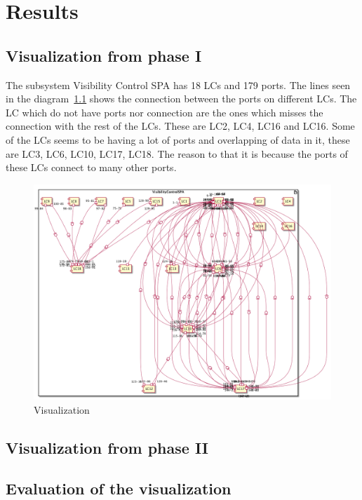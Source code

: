 \chapter{Results}

\section{Visualization from phase I}
The subsystem Visibility Control SPA has 18 LCs and 179 ports. The lines seen in the diagram~\ref{fig:visualization_one} shows the connection between the ports on different LCs. The LC which do not have ports nor connection are the ones which misses the connection with the rest of the LCs. These are LC2, LC4, LC16 and LC16. Some of the LCs seems to be having a lot of ports and overlapping of data in it, these are LC3, LC6, LC10, LC17, LC18. The reason to that it is because the ports of these LCs connect to many other ports.  
\todo{[to be filled in]}


\begin{figure}[H]
\centering
\captionsetup{justification=centering}
\vspace{0cm}%
\includegraphics[width=1\linewidth]{figure/results/visualization_1.png}
\caption{Visualization}
\label{fig:visualization_one}
\end{figure}

\todo{[to be filled in]}


\section{Visualization from phase II}
\todo{[to be filled in]}


\section{Evaluation of the visualization}
\todo{[to be filled in]}

